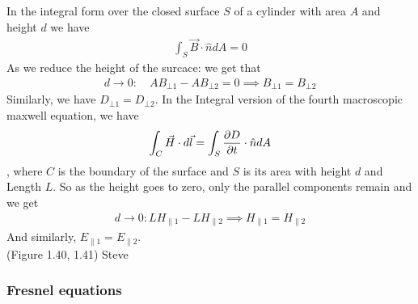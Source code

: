 In the integral form over the closed surface $S$ of a cylinder with area $A$ and height $d$ we have
\begin{align*}
\int_S \vec{B} \cdot\hat{n}dA = 0
\end{align*}
As we reduce the height of the surcace: we get that
\begin{align*}
	d \to 0: \quad AB_{\bot1} - AB_{\bot 2} = 0 \implies B_{\bot 1} = B_{\bot 2}
\end{align*}
Similarly, we have $D_{\bot1} = D_{\bot2}$. In the Integral version of the fourth macroscopic maxwell equation, we have
\begin{align*}
\int_C \vec{H} \cdot d \vec{l} = \int_S \frac{\partial D}{\partial t} \cdot \hat{n} dA
\end{align*}
, where $C$ is the boundary of the surface and $S$ is its area with height $d$ and Length $L$. So as the height goes to zero, only the parallel components remain and we get
\begin{align*}
d \to 0: L H_{\parallel 1} - LH_{\parallel2} \implies H_{\parallel1} = H_{\parallel2} 
\end{align*}
And similarly, $E_{\parallel1} = E_{\parallel2}$.\\
(Figure 1.40, 1.41) Steve

\subsubsection{Fresnel equations}

